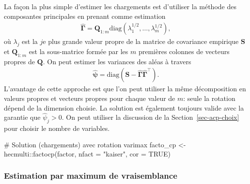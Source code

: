 \documentclass[
  11pt,
  letterpaper,
]{scrbook}
\newenvironment{Shaded}{\begin{snugshade}}{\end{snugshade}}
\newcommand{\AttributeTok}[1]{\textcolor[rgb]{0.40,0.45,0.13}{#1}}
\newcommand{\CommentTok}[1]{\textcolor[rgb]{0.37,0.37,0.37}{#1}}
\newcommand{\ConstantTok}[1]{\textcolor[rgb]{0.56,0.35,0.01}{#1}}
\newcommand{\FunctionTok}[1]{\textcolor[rgb]{0.28,0.35,0.67}{#1}}
\newcommand{\NormalTok}[1]{\textcolor[rgb]{0.00,0.23,0.31}{#1}}
\newcommand{\OtherTok}[1]{\textcolor[rgb]{0.00,0.23,0.31}{#1}}
\newcommand{\SpecialCharTok}[1]{\textcolor[rgb]{0.37,0.37,0.37}{#1}}
\newcommand{\StringTok}[1]{\textcolor[rgb]{0.13,0.47,0.30}{#1}}
\theoremstyle{definition}
\theoremstyle{remark}
\begin{document}
La façon la plus simple d'estimer les chargements est d'utiliser la
méthode des composantes principales en prenant comme estimation
\begin{align*}
\widehat{\boldsymbol{\Gamma}} = \boldsymbol{Q}_{1:m} \mathrm{diag}(\lambda_1^{1/2}, \ldots, \lambda_m^{1/2}),
\end{align*} où \(\lambda_j\) est la \(j\)e plus grande valeur propre de
la matrice de covariance empirique \(\mathbf{S}\) et
\(\boldsymbol{Q}_{1:m}\) est la sous-matrice formée par les \(m\)
premières colonnes de vecteurs propres de \(\boldsymbol{Q}\). On peut
estimer les variances des aléas à travers \begin{align*}
\widehat{\boldsymbol{\psi}} = \mathrm{diag}\left(\mathbf{S} - \widehat{\boldsymbol{\Gamma}}\widehat{\boldsymbol{\Gamma}}^\top\right).
\end{align*} L'avantage de cette approche est que l'on peut utiliser la
même décomposition en valeurs propres et vecteurs propres pour chaque
valeur de \(m\): seule la rotation dépend de la dimension choisie. La
solution est également toujours valide avec la garantie que
\(\widehat{\psi}_j>0\). On peut utiliser la discussion de la
Section~\ref{sec-acp-choix} pour choisir le nombre de variables.

\begin{Shaded}
\begin{Highlighting}[]
\CommentTok{\# Solution (chargements) avec rotation varimax}
\NormalTok{facto\_cp }\OtherTok{\textless{}{-}}\NormalTok{ hecmulti}\SpecialCharTok{::}\FunctionTok{factocp}\NormalTok{(factor, }\AttributeTok{nfact =} \StringTok{"kaiser"}\NormalTok{, }\AttributeTok{cor =} \ConstantTok{TRUE}\NormalTok{)}
\end{Highlighting}
\end{Shaded}

\hypertarget{estimation-par-maximum-de-vraisemblance}{%
\subsubsection{Estimation par maximum de
vraisemblance}\label{estimation-par-maximum-de-vraisemblance}}
\end{document}
